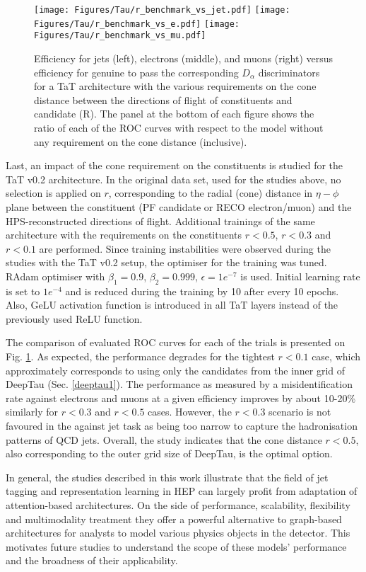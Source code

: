 \begin{figure}[!t]
    \centering
    \texttt{[image: Figures/Tau/r\_benchmark\_vs\_jet.pdf]}
    \texttt{[image: Figures/Tau/r\_benchmark\_vs\_e.pdf]}
    \texttt{[image: Figures/Tau/r\_benchmark\_vs\_mu.pdf]}
    \caption{Efficiency for jets (left), electrons (middle), and muons (right) versus efficiency for genuine \tauh to pass the corresponding $D_\alpha$ discriminators for a TaT architecture with the various requirements on the cone distance between the directions of flight of constituents and \tauh candidate (R). The panel at the bottom of each figure shows the ratio of each of the ROC curves with respect to the model without any requirement on the cone distance (inclusive).}
    \label{fig:r_benchmark}
\end{figure}
Last, an impact of the cone requirement on the constituents is studied for the TaT v0.2 architecture. In the original data set, used for the studies above, no selection is applied on $r$, corresponding to the radial (cone) distance in $\eta-\phi$ plane between the constituent (PF candidate or RECO electron/muon) and the HPS-reconstructed \tauh directions of flight. Additional trainings of the same architecture with the requirements on the constituents $r<0.5$, $r<0.3$ and $r<0.1$ are performed. Since training instabilities were observed during the studies with the TaT v0.2 setup, the optimiser for the training was tuned. RAdam \cite{liu2019variance} optimiser with $\beta_1=0.9$, $\beta_2=0.999$, $\epsilon=1e^{-7}$ is used. Initial learning rate is set to $1e^{-4}$ and is reduced during the training by 10 after every 10 epochs.  Also, GeLU activation function \cite{hendrycks2016gaussian} is introduced in all TaT layers instead of the previously used ReLU function.

The comparison of evaluated ROC curves for each of the trials is presented on Fig. \ref{fig:r_benchmark}. As expected, the performance degrades for the tightest $r < 0.1$ case, which approximately corresponds to using only the candidates from the inner grid of DeepTau (Sec. \ref{deeptau1}). The performance as measured by a misidentification rate against electrons and muons at a given \tauh efficiency improves by about 10-20\% similarly for $r < 0.3$ and $r < 0.5$ cases. However, the $r < 0.3$ scenario is not favoured in the against jet task as being too narrow to capture the hadronisation patterns of QCD jets. Overall, the study indicates that the cone distance $r < 0.5$, also corresponding to the outer grid size of DeepTau, is the optimal option.  

In general, the studies described in this work illustrate that the field of jet tagging and representation learning in HEP can largely profit from adaptation of attention-based architectures. On the side of performance, scalability, flexibility and multimodality treatment they offer a powerful alternative to graph-based architectures for analysts to model various physics objects in the detector. This motivates future studies to understand the scope of these models' performance and the broadness of their applicability.